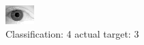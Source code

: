 \begin{figure}[h!]
\begin{center}
\includegraphics[width=0.60\columnwidth]{figures/ID2183_class_4_target_3.png}
\end{center}
\caption{ Classification: 4 actual target: 3}
\label{fig:ID2183_class_4_target_3}
\end{figure}
